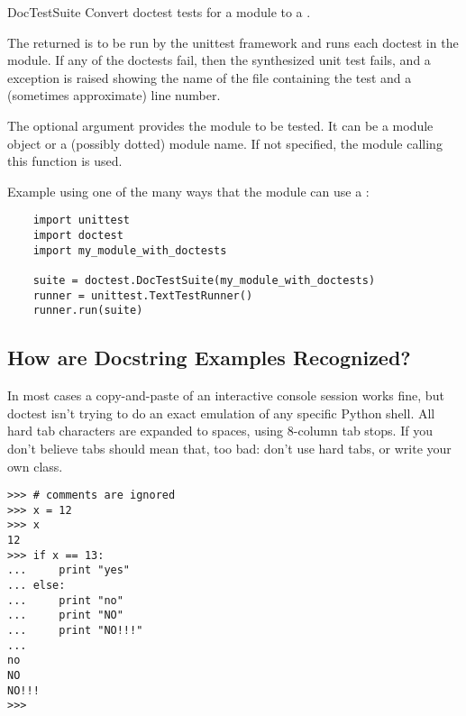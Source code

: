 \begin{funcdesc}{DocTestSuite}{}
  Convert doctest tests for a module to a
  .

  The returned  is to be run by the unittest framework
  and runs each doctest in the module.  If any of the doctests fail,
  then the synthesized unit test fails, and a 
  exception is raised showing the name of the file containing the test and a
  (sometimes approximate) line number.

  The optional  argument provides the module to be tested.  It
  can be a module object or a (possibly dotted) module name.  If not
  specified, the module calling this function is used.

  Example using one of the many ways that the  module
  can use a :

  \begin{verbatim}
    import unittest
    import doctest
    import my_module_with_doctests

    suite = doctest.DocTestSuite(my_module_with_doctests)
    runner = unittest.TextTestRunner()
    runner.run(suite)
  \end{verbatim}

\end{funcdesc}


\subsection{How are Docstring Examples Recognized?}

In most cases a copy-and-paste of an interactive console session works
fine, but doctest isn't trying to do an exact emulation of any specific
Python shell.  All hard tab characters are expanded to spaces, using
8-column tab stops.  If you don't believe tabs should mean that, too
bad:  don't use hard tabs, or write your own 
class.


\begin{verbatim}
>>> # comments are ignored
>>> x = 12
>>> x
12
>>> if x == 13:
...     print "yes"
... else:
...     print "no"
...     print "NO"
...     print "NO!!!"
...
no
NO
NO!!!
>>>
\end{verbatim}

